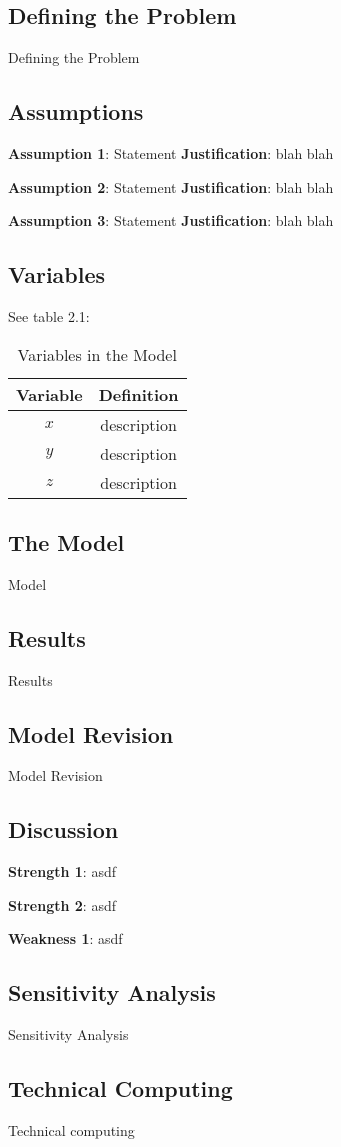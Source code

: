 \subsection{Defining the Problem}
Defining the Problem

\subsection{Assumptions}
\noindent\textbf{Assumption 1}: Statement
\textbf{Justification}: blah blah

\noindent\textbf{Assumption 2}: Statement
\textbf{Justification}: blah blah

\noindent\textbf{Assumption 3}: Statement
\textbf{Justification}: blah blah

\subsection{Variables}
See table 2.1:
\begin{table}[h!]
    \centering
    \begin{tabular}{cc}
        \toprule
        Variable & Definition      \\
        \midrule
        $x$      & description     \\
        $y$      & description     \\
        $z$      & description     \\
        \bottomrule
    \end{tabular}
    \caption{Variables in the Model}
    \label{tab:my_label}
\end{table}

\subsection{The Model}
Model

\subsection{Results}
Results

\subsection{Model Revision}
Model Revision

\subsection{Discussion}

\noindent\textbf{Strength 1}: asdf

\noindent\textbf{Strength 2}: asdf

\noindent\textbf{Weakness 1}: asdf

\subsection{Sensitivity Analysis}
Sensitivity Analysis

\subsection{Technical Computing}
Technical computing
